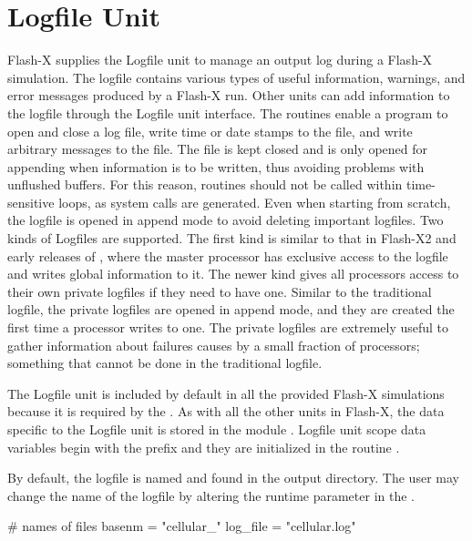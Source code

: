 \chapter{Logfile Unit}\label{Chp:Logfile Unit}



Flash-X supplies the \unit{Logfile} unit to manage an output log during a Flash-X simulation.
The logfile contains various types of useful information, warnings,
and error messages produced by a Flash-X run.
Other units can add information to  the logfile through the \unit{Logfile} unit interface.
The  routines enable a program to open and close a log file, write time or date
stamps to the file, and write arbitrary messages to the file.
The file is kept closed and is only opened for appending
when information is to be written, thus avoiding problems with
unflushed buffers.  For this reason,  routines should
not be called within time-sensitive loops, as system calls are generated.
Even when starting from scratch, the logfile is opened in append
mode to avoid deleting important logfiles. Two kinds of Logfiles are
supported. The first kind is similar to that in Flash-X2 and early releases of
\flashx, where the master processor has exclusive access to the
logfile and writes global information to it. The newer kind gives all
processors access to their own private logfiles if they need to have
one. Similar to the traditional logfile, the private logfiles are
opened in append mode, and they are created the first time a
processor writes to one. The private logfiles are extremely useful to
gather information about failures causes by a small fraction of
processors; something that cannot be done in the traditional logfile.

The \unit{Logfile} unit is included by default in all the provided Flash-X
simulations because it is required by the  .
As with all the other units in Flash-X, the data specific to the Logfile
unit is stored in the module .  Logfile
unit scope data variables begin with the prefix  and they are
initialized in the routine .

By default, the logfile is named  and found in the output directory.
The user may change the name of the logfile by altering the runtime parameter  in the
.
\begin{codeseg}
# names of files
basenm   = "cellular_"
log_file = "cellular.log"
\end{codeseg}

